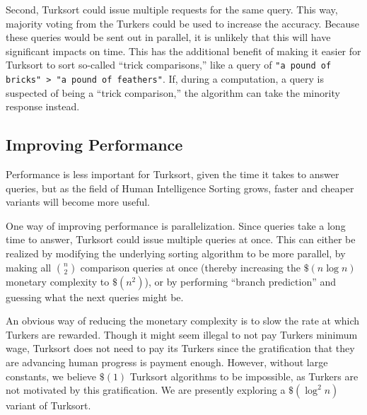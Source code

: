 \documentclass{article}
\begin{document}
Second, Turksort could issue multiple requests for the same query. This way,
majority voting from the Turkers could be used to increase the accuracy. Because
these queries would be sent out in parallel, it is unlikely that this will have
significant impacts on time. This has the additional benefit of making it easier
for Turksort to sort so-called ``trick comparisons,'' like a query of \texttt{"a
  pound of bricks" > "a pound of feathers"}. If, during a computation, a query
is suspected of being a ``trick comparison,'' the algorithm can take the
minority response instead.

\subsection{Improving Performance}\label{sec:improving-performance}

Performance is less important for Turksort, given the time it takes to answer
queries, but as the field of Human Intelligence Sorting grows, faster and
cheaper variants will become more useful. 

One way of improving performance is parallelization. Since queries take a long
time to answer, Turksort could issue multiple queries at once. This can either
be realized by modifying the underlying sorting algorithm to be more parallel,
by making all \({n \choose 2}\) comparison queries at once (thereby increasing
the \(\$(n \log n)\) monetary complexity to \(\$(n^2)\)), or by performing
``branch prediction'' and guessing what the next queries might be.

An obvious way of reducing the monetary complexity is to slow the rate at which
Turkers are rewarded. Though it might seem illegal to not pay Turkers minimum
wage, Turksort does not need to pay its Turkers since the gratification that
they are advancing human progress is payment enough. However, without
large constants, we believe \(\$(1)\) Turksort algorithms to be impossible,
as Turkers are not motivated by this gratification. We are presently exploring
a \(\$(\log^2 n)\) variant of Turksort.
\end{document}

